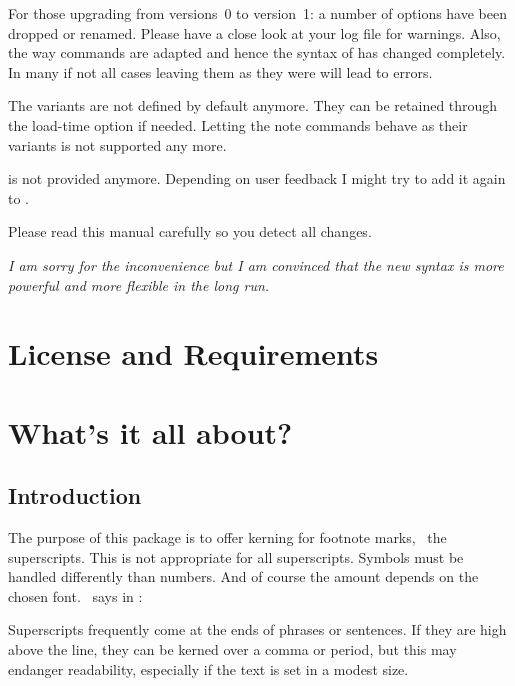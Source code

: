 \documentclass{fnpct-manual}
\begin{document}
\begin{bewareofthedog}
  For those upgrading from versions~0 to version~1: a number of options have
  been dropped or renamed. Please have a close look at your log file for
  warnings.  Also, the way commands are adapted and hence the syntax of
   has changed completely. In many if not all cases leaving them
  as they were will lead to errors. \par
  The  variants are not defined by default anymore. They can be
  retained through the load-time option  if needed.  Letting
  the note commands behave as their  variants is not supported
  any more. \par
   is not provided anymore. Depending on user feedback I might
  try to add it again to \fnpct. \par
  Please read this manual carefully so you detect all changes. \par
  \emph{I am sorry for the inconvenience but I am convinced that the new
    syntax is more powerful and more flexible in the long run.}
\end{bewareofthedog}

\section{License and Requirements}
\license

\section{What's it all about?}
\subsection{Introduction}
The purpose of this package is to offer kerning for footnote marks, \ie\ the
superscripts. This is not appropriate for all superscripts.  Symbols must be
handled differently than numbers.  And of course the amount depends on the
chosen font.  \bringhurst\ says in :

\begin{cnltxquote}
  Superscripts frequently come at the ends of phrases or sentences.  If they
  are high above the line, they can be kerned over a comma or period, but this
  may endanger readability, especially if the text is set in a modest size.
\end{cnltxquote}
\end{document}
